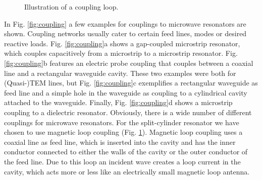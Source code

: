 \begin{figure}
\centering
{}
\caption{Illustration of a coupling loop.}\label{fig:loop}
\end{figure}

In Fig. \ref{fig:coupling} a few examples for couplings to microwave resonators are shown. Coupling networks usually cater to certain feed lines, modes or desired reactive loads. Fig. \ref{fig:coupling}a shows a gap-coupled microstrip resonator, which couples capacitively from a microstrip to a microstrip resonator. Fig. \ref{fig:coupling}b features an electric probe coupling that couples between a coaxial line and a rectangular waveguide cavity. These two examples were both for (Quasi-)TEM lines, but Fig. \ref{fig:coupling}c exemplifies a rectangular waveguide as feed line and a simple hole in the waveguide as coupling to a cylindrical cavity attached to the waveguide. Finally, Fig. \ref{fig:coupling}d shows a microstrip coupling to a dielectric resonator. Obviously, there is a wide number of different couplings for microwave resonators. For the split-cylinder resonator we have chosen to use magnetic loop coupling (Fig. \ref{fig:loop}). Magnetic loop coupling uses a coaxial line as feed line, which is inserted into the cavity and has the inner conductor connected to either the walls of the cavity or the outer conductor of the feed line. Due to this loop an incident wave creates a loop current in the cavity, which acts more or less like an electrically small magnetic loop antenna.

